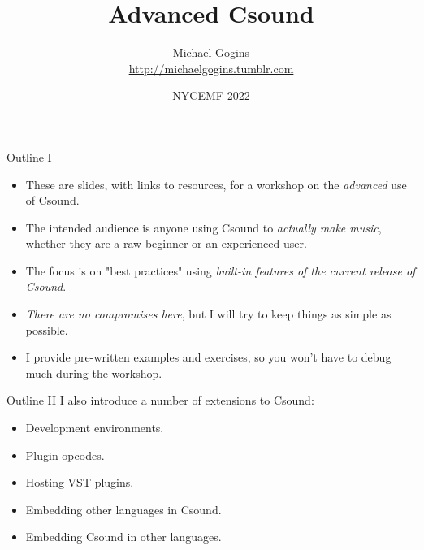 \documentclass{beamer}
\title{Advanced Csound}
\author[Gogins] %
{Michael Gogins \\ \url{http://michaelgogins.tumblr.com} }
\institute[Irreducible Productions] %
{
    Irreducible Productions\\
    New York
}
\date[NYCEMF 2022] %
{NYCEMF 2022}
\begin{document}
    
    \begin{frame}
        \titlepage
    \end{frame}
    
    \begin{frame}{Outline I}
        \begin{itemize}
            \item These are slides, with links to resources, for a workshop on the
            \textit{advanced} use of Csound.
            
            \item The intended audience is anyone using Csound to \textit{actually make
                music}, whether they are a raw beginner or an experienced user.
            
            \item The focus is on "best practices" using \textit{built-in features of
                the current release of Csound}.
            
            \item \textit{There are no compromises here}, but I will try to keep things
            as simple as possible.
            
            \item I provide pre-written examples and exercises, so you won't have to debug much 
            during the workshop.
        \end{itemize}
    \end{frame}
    
    \begin{frame}{Outline II}
        I also introduce a number of extensions to Csound: 
        \begin{itemize}
            \item Development environments.
            \item Plugin opcodes.
            \item Hosting VST plugins.
            \item Embedding other languages in Csound.
            \item Embedding Csound in other languages.
        \end{itemize}
    \end{frame}
    
\end{document}
